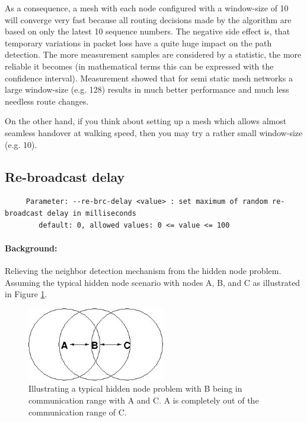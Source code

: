 \documentclass[11pt]{article}
\begin{document}
As a consequence, a mesh with each node configured with a window-size of 10 will converge very fast because all routing decisions made by the algorithm are based on only the latest 10 sequence numbers. The negative side effect is, that temporary variations in packet loss have a quite huge impact on the path detection. The more measurement samples are considered by a statistic, the more reliable it becomes (in mathematical terms this can be expressed with the confidence interval). Measurement showed that for semi static mesh networks a large window-size (e.g. 128) results in much better performance and much less needless route changes.

On the other hand, if you think about setting up a mesh which allows almost seamless handover at walking speed, then you may try a rather small window-size (e.g. 10).


\subsection{Re-broadcast delay}
\label{sec:re-brc-delay}

\begin{small}
\begin{verbatim}
     Parameter: --re-brc-delay <value> : set maximum of random re-broadcast delay in milliseconds
        default: 0, allowed values: 0 <= value <= 100
\end{verbatim}
\end{small}

\paragraph{Background:} Relieving the neighbor detection mechanism from the hidden node problem.
%
Assuming the typical hidden node scenario with nodes A, B, and C as illustrated in Figure \ref{fig:hiddenNode}.

\begin{figure}[htbp]
  \begin{center}
    \includegraphics[width=6cm]{hiddenNode-x01.jpg}
    \caption{Illustrating a typical hidden node problem with B being in communication range with A and C.  A is completely out of the communication range of C.}
    \label{fig:hiddenNode}
  \end{center}
\end{figure}
\end{document}
